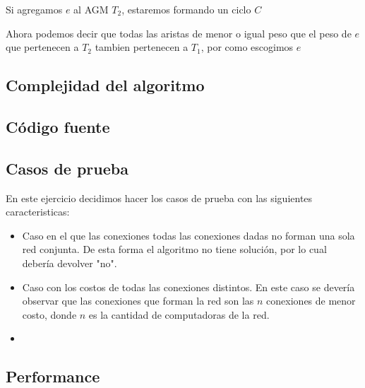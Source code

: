 Si agregamos $e$ al AGM $T_2$, estaremos formando un ciclo $C$

Ahora podemos decir que todas las aristas de menor o igual peso que el peso de $e$ que pertenecen a $T_2$ tambien pertenecen a $T_1$, por como escogimos $e$

\subsection{Complejidad del algoritmo}


\subsection{C\'odigo fuente}


\subsection{Casos de prueba}

En este ejercicio decidimos hacer los casos de prueba con las siguientes caracteristicas:

\begin{itemize}
\item Caso en el que las conexiones todas las conexiones dadas no forman una sola red conjunta. De esta forma el algoritmo no tiene solución, por lo cual debería devolver "no".
\item Caso con los costos de todas las conexiones distintos. En este caso se devería observar que las conexiones que forman la red son las $n$ conexiones de menor costo, donde $n$ es la cantidad de computadoras de la red.
\item 
\end{itemize}


\subsection{Performance}

